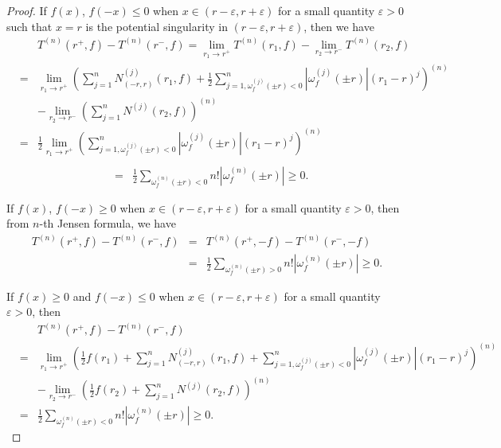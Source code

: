 \documentclass{article}
\begin{document}
\begin{proof}
    If $f(x)$, $f(-x)\leq 0$ when $x\in(r-\varepsilon, r+\varepsilon)$ for a small quantity $\varepsilon>0$ such that $x=r$ is the potential singularity in $(r-\varepsilon, r+\varepsilon)$, then we have
    \begin{eqnarray*}
        &&T^{(n)}(r^{+}, f)-T^{(n)}(r^{-}, f)=\lim\limits_{r_{1}\rightarrow r^{+}}T^{(n)}(r_{1}, f)-\lim\limits_{r_{2}\rightarrow r^{-}}T^{(n)}(r_{2}, f)\\
        &=&\lim\limits_{r_{1}\rightarrow r^{+}}\left( \sum_{j=1}^{n}N_{(-r, r)}^{(j)}(r_{1}, f)+\frac{1}{2}\sum_{j=1,\omega_{f}^{(j)}(\pm r)<0 }^{n}|\omega_{f}^{(j)}(\pm r)|(r_{1}-r)^{j}\right)^{(n)}\\
        &&-\lim\limits_{r_{2}\rightarrow r^{-}}\left(\sum_{j=1}^{n}N^{(j)}(r_{2}, f)\right)^{(n)}\\
        &=& \frac{1}{2}\lim\limits_{r_{1}\rightarrow r^{+}}\left(\sum_{j=1,\omega_{f}^{(j)}(\pm r)<0 }^{n}|\omega_{f}^{(j)}(\pm r)|(r_{1}-r)^{j}\right)^{(n)}\\
        \end{eqnarray*}
        \begin{eqnarray*}
        &=&\frac{1}{2}\sum_{\omega_{f}^{(n)}(\pm r)<0}n!|\omega_{f}^{(n)}(\pm r)|\geq 0.
    \end{eqnarray*}
    
    If $f(x)$, $f(-x)\geq 0$ when $x\in(r-\varepsilon, r+\varepsilon)$ for a small quantity $\varepsilon>0$, then from $n$-th Jensen formula, we have
    \begin{eqnarray*}
        T^{(n)}(r^{+}, f)-T^{(n)}(r^{-}, f)&=&T^{(n)}(r^{+}, -f)-T^{(n)}(r^{-}, -f)\\
        &=&\frac{1}{2}\sum_{\omega_{f}^{(n)}(\pm r)>0}n!|\omega_{f}^{(n)}(\pm r)|\geq 0.
    \end{eqnarray*} 

     If $f(x)\geq 0$ and $f(-x)\leq 0$ when $x\in(r-\varepsilon, r+\varepsilon)$ for a small quantity $\varepsilon>0$, then 
    \begin{eqnarray*}
        &&T^{(n)}(r^{+}, f)-T^{(n)}(r^{-}, f)\\
        &=&\lim\limits_{r_{1}\rightarrow r^{+}}\left( \frac{1}{2}f(r_{1})+\sum_{j=1}^{n}N_{(-r, r)}^{(j)}(r_{1}, f)+\sum_{j=1,\omega_{f}^{(j)}(\pm r)<0 }^{n}|\omega_{f}^{(j)}(\pm r)|(r_{1}-r)^{j}\right)^{(n)}\\
        &&-\lim\limits_{r_{2}\rightarrow r^{-}}\left(\frac{1}{2}f(r_{2})+\sum_{j=1}^{n}N^{(j)}(r_{2}, f)\right)^{(n)}\\
        &=&\frac{1}{2}\sum_{\omega_{f}^{(n)}(\pm r)<0}n!|\omega_{f}^{(n)}(\pm r)|\geq 0.
    \end{eqnarray*}


\end{proof}
\end{document}
